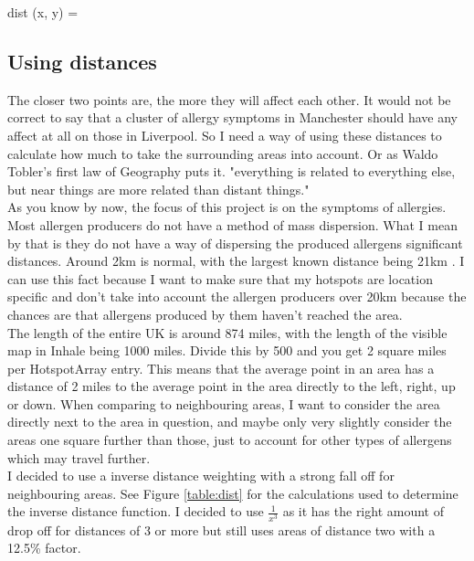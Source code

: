 dist (x, y)  = 
\label{dia:manhat}\\

\subsection{Using distances}

The closer two points are, the more they will affect each other. It would not be correct to say that a cluster of allergy symptoms in Manchester should have any affect at all on those in Liverpool. So I need a way of using these distances to calculate how much to take the surrounding areas into account. Or as Waldo Tobler's first law of Geography puts it. "everything is related to everything else, but near things are more related than distant things." \cite{waldo}\\

As you know by now, the focus of this project is on the symptoms  of allergies. Most allergen producers do not have a method of mass dispersion. What I mean by that is they do not have a way of dispersing the produced allergens significant distances. Around 2km is normal, with the largest known distance being 21km \cite{pollenwr}. I can use this fact because I want to make sure that my hotspots are location specific and don't take into account the allergen producers over 20km because the chances are that allergens produced by them haven't reached the area.\\

The length of the entire UK is around 874 miles, with the length of the visible map in Inhale being 1000 miles. Divide this by 500 and you get 2 square miles per HotspotArray entry. This means that the average point in an area has a distance of 2 miles to the average point in the area directly to the left, right, up or down. When comparing to neighbouring areas, I want to consider the area directly next to the area in question, and maybe only very slightly consider the areas one square further than those, just to account for other types of allergens which may travel further.\\

I decided to use a inverse distance weighting with a strong fall off for neighbouring areas. See Figure \ref{table:dist} for the calculations used to determine the inverse distance function. I decided to use $\frac{1}{x^3}$ as it has the right amount of drop off for distances of 3 or more but still uses areas of distance two with a 12.5\% factor.\\ 

